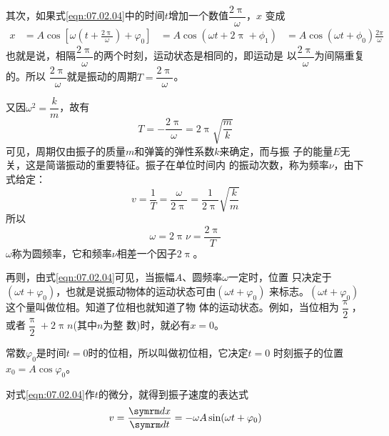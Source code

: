 其次，如果式\eqref{eqn:07.02.04}中的时间$ t $增加一个数值$ \dfrac { 2 \uppi } { \omega } $，$ x $
变成
\begin{equation*}
	\begin{aligned}
	x &= A \cos \left[ \omega \left( t + \frac { 2 \uppi } { \omega } \right) + \varphi _ { 0 } \right]
	&= A \cos ( \omega t + 2 \uppi + \phi _ { 1 } )
	&= A \cos ( \omega t + \phi _ { 0 } )
\frac { 2 \pi } { \omega }
	\end{aligned}
\end{equation*}
也就是说，相隔$ \dfrac { 2 \uppi } { \omega } $的两个时刻，运动状态是相同的，即运动是
以$ \dfrac { 2 \uppi } { \omega } $为间隔重复的。所以 $ \dfrac { 2 \uppi } { \omega } $就是振动的周期$ T = \dfrac { 2 \uppi } { \omega } $。

又因$ \omega ^ { 2 } = \dfrac { k } { m } $，故有
\begin{equation}\label{eqn:07.02.06}
	T = - \frac { 2 \uppi } { \omega } = 2 \uppi \sqrt { \frac { m } { k } }
\end{equation}
可见，周期仅由振子的质量$ m $和弹簧的弹性系数$ k $来确定，而与振
子的能量$ E $无关，这是简谐振动的重要特征。振子在单位时间内
的振动次数，称为频率$ \nu $，由下式给定：
\begin{equation*}
	v = \frac { 1 } { T } = \frac { \omega } { 2 \uppi } = \frac { 1 } { 2 \uppi } \sqrt { \frac { k } { m } }
\end{equation*}
所以
\begin{equation*}
	\omega = 2 \uppi \nu = \frac { 2 \uppi } { T }
\end{equation*}
$ \omega $称为圆频率，它和频率$ \nu $相差一个因子$ 2 \uppi $。

再则，由式\eqref{eqn:07.02.04}可见，当振幅$ A $、圆频率$ \omega $一定时，位置
只决定于$ ( \omega t + \varphi _ { 0 } ) $，也就是说振动物体的运动状态可由$ ( \omega t + \varphi _ { 0 } ) $
来标志。$ ( \omega t + \varphi _ { 0 } ) $这个量叫做位相。知道了位相也就知道了物
体的运动状态。例如，当位相为$ \dfrac { \uppi } { 2 } $，或者$ \dfrac { \uppi } { 2 } + 2 \uppi n $(其中$ n $为整
数)时，就必有$  x = 0   $。

常数$ \varphi _ { 0 } $是时间$  t = 0   $时的位相，所以叫做初位相，它决定$  t = 0  $
时刻振子的位置$  x _ { 0 } = A \cos \varphi _ { 0 }  $。

对式\eqref{eqn:07.02.04}作$ t $的微分，就得到振子速度的表达式
\begin{equation}\label{eqn:07.02.07}
	v = \frac { \dif x } { \dif t } = - \omega A \sin ( \omega t + \varphi _ { 0 } )
\end{equation}

